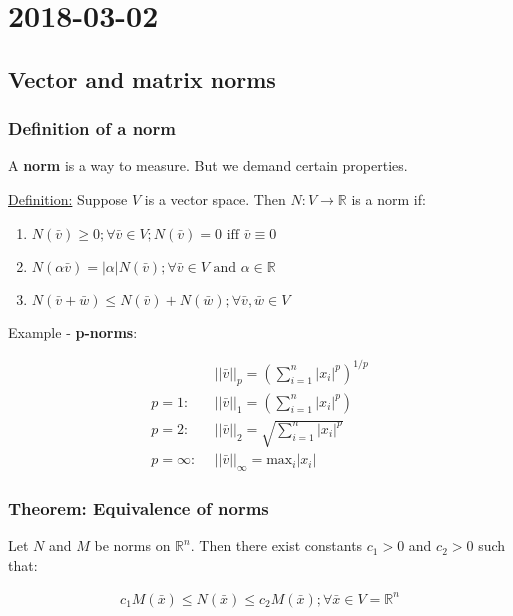 \section{2018-03-02}

\subsection{Vector and matrix norms}

\subsubsection{Definition of a norm}

A \textbf{norm} is a way to measure. But we demand certain properties.

\underline{Definition:} Suppose $V$ is a vector space. Then $N: V \rightarrow \mathbb{R}$ is a norm if:

\begin{enumerate}
  \item $N(\bar{v}) \geq 0; \forall \bar{v} \in V; N(\bar{v}) = 0 \text{ iff } \bar{v} \equiv 0$
  \item $N(\alpha \bar{v}) = |\alpha| N(\bar{v}); \forall \bar{v} \in V \text{ and } \alpha \in \mathbb{R}$
  \item $N(\bar{v}+\bar{w}) \leq N(\bar{v}) + N(\bar{w}); \forall \bar{v}, \bar{w} \in V$
\end{enumerate}

Example - \textbf{p-norms}:

\begin{align*}
                  &||\bar{v}||_p      = (\sum_{i=1}^{n} |x_i|^p)^{1/p} \\
  p = 1:\ \       &||\bar{v}||_1      = (\sum_{i=1}^{n} |x_i|^p) \\
  p = 2:\ \       &||\bar{v}||_2      = \sqrt{\sum_{i=1}^{n} |x_i|^p} \\
  p = \infty:\ \  &||\bar{v}||_\infty = \text{max}_i |x_i|
\end{align*}

\subsubsection{Theorem: Equivalence of norms}

Let $N$ and $M$ be norms on $\mathbb{R}^n$. Then there exist constants $c_1 > 0$ and $c_2 > 0$ such that:

\begin{align*}
  c_1 M(\bar{x}) \leq N(\bar{x}) \leq c_2 M(\bar{x}); \forall \bar{x} \in V = \mathbb{R}^n
\end{align*}

